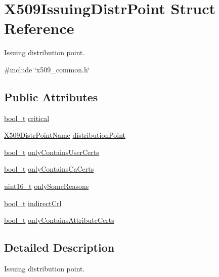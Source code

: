 \hypertarget{structX509IssuingDistrPoint}{}\section{X509\+Issuing\+Distr\+Point Struct Reference}
\label{structX509IssuingDistrPoint}


Issuing distribution point.  




{\ttfamily \#include \char`\"{}x509\+\_\+common.\+h\char`\"{}}

\subsection*{Public Attributes}
\begin{DoxyCompactItemize}
\item 
\hyperlink{compiler__port_8h_a812d16e5494522586b3784e55d479912}{bool\+\_\+t} \hyperlink{structX509IssuingDistrPoint_a8a4ba72628597652b8722195d3b0e4c5}{critical}
\item 
\hyperlink{structX509DistrPointName}{X509\+Distr\+Point\+Name} \hyperlink{structX509IssuingDistrPoint_a606d3c2cd4e2e1edb16231e71e7f8233}{distribution\+Point}
\item 
\hyperlink{compiler__port_8h_a812d16e5494522586b3784e55d479912}{bool\+\_\+t} \hyperlink{structX509IssuingDistrPoint_a3dde449bdf1ed32a2f768d9f65190b8c}{only\+Contains\+User\+Certs}
\item 
\hyperlink{compiler__port_8h_a812d16e5494522586b3784e55d479912}{bool\+\_\+t} \hyperlink{structX509IssuingDistrPoint_a26dda81d883f442a0efc63043b12f386}{only\+Contains\+Ca\+Certs}
\item 
\hyperlink{stdint_8h_a273cf69d639a59973b6019625df33e30}{uint16\+\_\+t} \hyperlink{structX509IssuingDistrPoint_a5192983171fe2337eedb43f29080ac50}{only\+Some\+Reasons}
\item 
\hyperlink{compiler__port_8h_a812d16e5494522586b3784e55d479912}{bool\+\_\+t} \hyperlink{structX509IssuingDistrPoint_a9caa38c5038747f071f9b03970a1e9e6}{indirect\+Crl}
\item 
\hyperlink{compiler__port_8h_a812d16e5494522586b3784e55d479912}{bool\+\_\+t} \hyperlink{structX509IssuingDistrPoint_a99dd1689d124d9acbe6892d709cfec6a}{only\+Contains\+Attribute\+Certs}
\end{DoxyCompactItemize}


\subsection{Detailed Description}
Issuing distribution point. 

